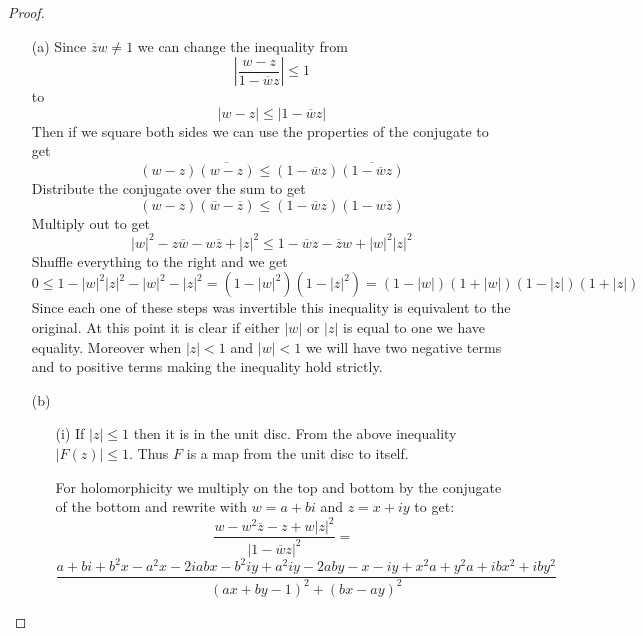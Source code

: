 \documentclass[10pt]{article}
\newcommand{\conj}[1]{\overline{#1}}
\theoremstyle{plain}
\theoremstyle{remark}
\begin{document}
\begin{proof}
  \begin{itemize}
  \item[(a)] Since $\conj{z}w\neq 1$ we can change the inequality from
    \[
      \left|
        \frac{w-z}{1-\conj{w}{z}}
      \right| \leq 1
    \]
    to
    \[
      |w-z|\leq |1-\conj{w}z|
    \]
    Then if we square both sides we can use the properties of the conjugate
    to get
    \[
      (w-z)\conj{(w-z)} \leq (1-\conj{w}z)\conj{(1-\conj{w}z)}
    \]
    Distribute the conjugate over the sum to get
    \[
      (w-z)(\conj{w}-\conj{z})\leq (1-\conj{w}z)(1-w\conj{z})
    \]
    Multiply out to get
    \[
      |w|^2-z\conj{w}-w\conj{z} + |z|^2\leq 1-\conj{w}z-\conj{z}w+|w|^2|z|^2
    \]
    Shuffle everything to the right and we get
    \[
      0 \leq 1-|w|^2|z|^2 -|w|^2-|z|^2 = (1-|w|^2)(1-|z|^2) = (1-|w|)(1+|w|)(1-|z|)(1+|z|)
    \]
    Since each one of these steps was invertible this inequality is equivalent
    to the original. At this point it is clear if either $|w|$ or $|z|$ is
    equal to one we have equality. Moreover when $|z|<1$ and $|w|<1$ we will
    have two negative terms and to positive terms making the inequality hold
    strictly.
  \item[(b)]
    \begin{itemize}
    \item[(i)] If $|z|\leq 1$ then  it is in the unit disc. From the above
      inequality $|F(z)|\leq 1$. Thus $F$ is a map from the unit disc to
      itself.

      For holomorphicity we multiply on the top and bottom by the conjugate of the bottom and
      rewrite with $w=a+bi$ and $z=x+iy$ to get:
      \[
        \frac{w-w^2\conj{z}-z+w|z|^2}{|1-\conj{w}z|^2}=
      \]
      \[
        \frac{a+bi+b^2x-a^2x-2iabx-b^2iy+a^2iy-2aby-x-iy+x^2a+y^2a+ibx^2+iby^2}{{\left(a x + b y - 1\right)}^{2} + {\left(b x - a y\right)}^{2}}
      \]


\end{itemize}
\end{itemize}
\end{proof}
\end{document}
